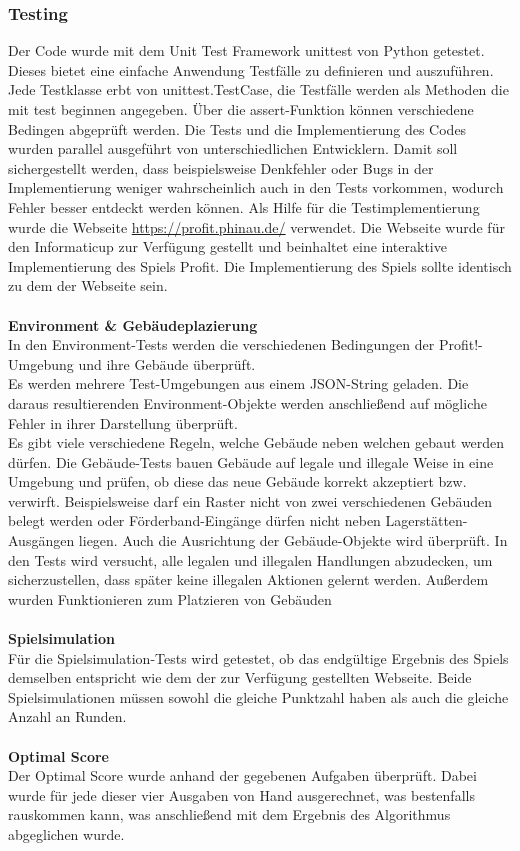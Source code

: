 \subsubsection{Testing}
Der Code wurde mit dem Unit Test Framework unittest von Python getestet. Dieses bietet eine einfache Anwendung Testfälle zu definieren und auszuführen. 
Jede Testklasse erbt von unittest.TestCase, die Testfälle werden als Methoden die mit test beginnen angegeben. Über die assert-Funktion können verschiedene Bedingen abgeprüft werden.
Die Tests und die Implementierung des Codes wurden parallel ausgeführt von unterschiedlichen Entwicklern. Damit soll sichergestellt werden, dass beispielsweise Denkfehler oder Bugs in der Implementierung weniger wahrscheinlich auch in den Tests vorkommen, wodurch Fehler besser entdeckt werden können. 
Als Hilfe für die Testimplementierung wurde die Webseite \url{https://profit.phinau.de/}  verwendet. Die Webseite wurde für den Informaticup zur Verfügung gestellt und beinhaltet eine interaktive Implementierung des Spiels Profit. Die Implementierung des Spiels sollte identisch zu dem der Webseite sein.
\\\\
\textbf{Environment \& Gebäudeplazierung}\\
In den Environment-Tests werden die verschiedenen Bedingungen der Profit!-Umgebung und ihre Gebäude überprüft.
\\
Es werden mehrere Test-Umgebungen aus einem JSON-String geladen. Die daraus resultierenden Environment-Objekte werden anschließend auf mögliche Fehler in ihrer Darstellung überprüft.
\\
Es gibt viele verschiedene Regeln, welche Gebäude neben welchen gebaut werden dürfen. Die Gebäude-Tests bauen Gebäude auf legale und illegale Weise in eine Umgebung und prüfen, ob diese das neue Gebäude korrekt akzeptiert bzw. verwirft. 
Beispielsweise darf ein Raster nicht von zwei verschiedenen Gebäuden belegt werden oder Förderband-Eingänge dürfen nicht neben Lagerstätten-Ausgängen liegen. Auch die Ausrichtung der Gebäude-Objekte wird überprüft.
In den Tests wird versucht, alle legalen und illegalen Handlungen abzudecken, um sicherzustellen, dass später keine illegalen Aktionen gelernt werden. 
Außerdem wurden Funktionieren zum Platzieren von Gebäuden
\\\\
\textbf{Spielsimulation}\\
Für die Spielsimulation-Tests wird getestet, ob das endgültige Ergebnis des Spiels demselben entspricht wie dem der zur Verfügung gestellten Webseite. Beide Spielsimulationen müssen sowohl die gleiche Punktzahl haben als auch die gleiche Anzahl an Runden. 
\\\\
\textbf{Optimal Score}\\
Der Optimal Score wurde anhand der gegebenen Aufgaben überprüft. Dabei wurde für jede dieser vier Ausgaben von Hand ausgerechnet, was bestenfalls rauskommen kann, was anschließend mit dem Ergebnis des Algorithmus abgeglichen wurde.



